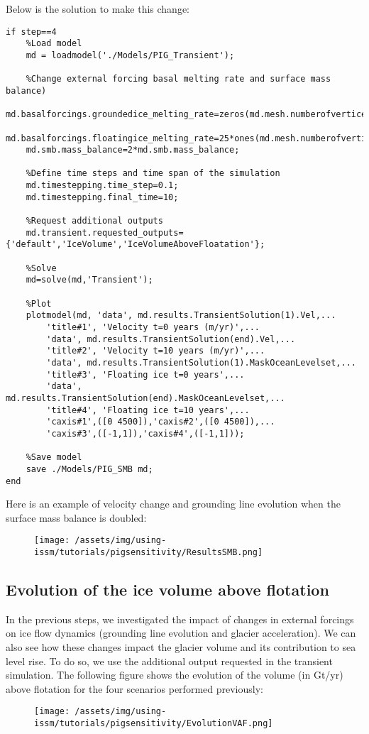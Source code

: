 Below is the solution to make this change:
\begin{verbatim}if step==4
	%Load model
	md = loadmodel('./Models/PIG_Transient');

	%Change external forcing basal melting rate and surface mass balance)
	md.basalforcings.groundedice_melting_rate=zeros(md.mesh.numberofvertices,1);
	md.basalforcings.floatingice_melting_rate=25*ones(md.mesh.numberofvertices,1);
	md.smb.mass_balance=2*md.smb.mass_balance;

	%Define time steps and time span of the simulation
	md.timestepping.time_step=0.1;
	md.timestepping.final_time=10;

	%Request additional outputs
	md.transient.requested_outputs={'default','IceVolume','IceVolumeAboveFloatation'};

	%Solve
	md=solve(md,'Transient');

	%Plot
	plotmodel(md, 'data', md.results.TransientSolution(1).Vel,...
		'title#1', 'Velocity t=0 years (m/yr)',...
		'data', md.results.TransientSolution(end).Vel,...
		'title#2', 'Velocity t=10 years (m/yr)',...
		'data', md.results.TransientSolution(1).MaskOceanLevelset,...
		'title#3', 'Floating ice t=0 years',...
		'data', md.results.TransientSolution(end).MaskOceanLevelset,...
		'title#4', 'Floating ice t=10 years',...
		'caxis#1',([0 4500]),'caxis#2',([0 4500]),...
		'caxis#3',([-1,1]),'caxis#4',([-1,1]));

	%Save model
	save ./Models/PIG_SMB md;
end\end{verbatim}

Here is an example of velocity change and grounding line evolution when the surface mass balance is doubled:
\begin{figure}[H]
	\begin{center}
		\texttt{[image: /assets/img/using-issm/tutorials/pigsensitivity/ResultsSMB.png]}
	\end{center}
\end{figure}
\subsection{Evolution of the ice volume above flotation} %
In the previous steps, we investigated the impact of changes in external forcings on ice flow dynamics (grounding line evolution and glacier acceleration). We can also see how these changes impact the glacier volume and its contribution to sea level rise. To do so, we use the additional output \verb@IceVolumeAboveFloatation@ requested in the transient simulation. The following figure shows the evolution of the volume (in Gt/yr) above flotation for the four scenarios performed previously:
\begin{figure}[H]
	\begin{center}
		\texttt{[image: /assets/img/using-issm/tutorials/pigsensitivity/EvolutionVAF.png]}
	\end{center}
\end{figure}
